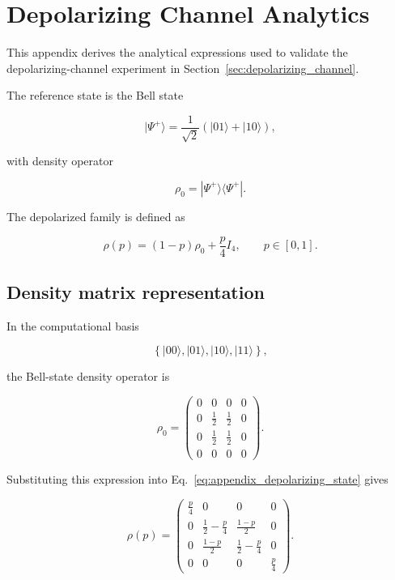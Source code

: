 
\chapter{Depolarizing Channel Analytics}
\label{app:depolarizing_channel_derivations}

This appendix derives the analytical expressions used to validate the depolarizing-channel experiment in Section~\ref{sec:depolarizing_channel}.

The reference state is the Bell state

\[
|\Psi^+\rangle
=
\frac{1}{\sqrt{2}}
\left(
|01\rangle + |10\rangle
\right),
\]

with density operator

\[
\rho_0
=
|\Psi^+\rangle
\langle\Psi^+|.
\]

The depolarized family is defined as

\begin{equation}
\rho(p)
=
(1-p)\rho_0
+
\frac{p}{4}I_4,
\qquad
p \in [0,1].
\label{eq:appendix_depolarizing_state}
\end{equation}


\section*{Density matrix representation}

In the computational basis

\[
\left\{
|00\rangle,
|01\rangle,
|10\rangle,
|11\rangle
\right\},
\]

the Bell-state density operator is

\[
\rho_0
=
\begin{pmatrix}
0 & 0 & 0 & 0 \\
0 & \frac{1}{2} & \frac{1}{2} & 0 \\
0 & \frac{1}{2} & \frac{1}{2} & 0 \\
0 & 0 & 0 & 0
\end{pmatrix}.
\]

Substituting this expression into Eq.~\eqref{eq:appendix_depolarizing_state} gives

\[
\rho(p)
=
\begin{pmatrix}
\frac{p}{4} & 0 & 0 & 0 \\
0 & \frac{1}{2}-\frac{p}{4} & \frac{1-p}{2} & 0 \\
0 & \frac{1-p}{2} & \frac{1}{2}-\frac{p}{4} & 0 \\
0 & 0 & 0 & \frac{p}{4}
\end{pmatrix}.
\]

